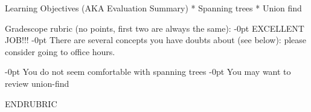 \documentclass[12pt]{exam}
\begin{document}


\begin{questions}
\end{questions}

\RUBRIC

Learning Objectives (AKA Evaluation Summary)
* Spanning trees
* Union find

Gradescope rubric (no points, first two are always the same):
-0pt EXCELLENT JOB!!!
-0pt There are several concepts you have doubts about (see below): please consider going to office hours.

-0pt You do not seem comfortable with spanning trees
-0pt You may want to review union-find

ENDRUBRIC


\end{document}
